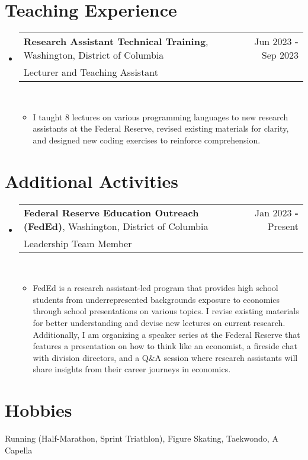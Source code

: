 \documentclass[letterpaper,11pt]{article}
\makeatletter
\newcommand{\Item}[1]{
  \item\small{
    {#1 \vspace{-2pt}}
  }
}
\newcommand{\Subheading}[4]{
  \vspace{-2pt}\item
    \begin{tabular*}{0.97\textwidth}[t]{l@{\extracolsep{\fill}}r}
      \textbf{#1}, #2 & #3 \\
      \small#4 \\
    \end{tabular*}\\
}
\newcommand{\SubHeadingListStart}{\begin{itemize}[leftmargin=0.15in, label={}]}
\newcommand{\SubHeadingListEnd}{\end{itemize}}
\newcommand{\ItemListStart}{\begin{itemize}}
\newcommand{\ItemListEnd}{\end{itemize}}
\makeatother
\begin{document}

\section{Teaching Experience}
  \SubHeadingListStart
    
    \Subheading
    {Research Assistant Technical Training}{Washington, District of Columbia}{Jun 2023 \textbf{-} Sep 2023}
    {Lecturer and Teaching Assistant}
      \vspace{-10pt}
      \ItemListStart
        \Item{I taught 8 lectures on various programming languages to 
        new research assistants at the Federal Reserve, revised existing 
        materials for clarity, and designed new coding exercises to reinforce 
        comprehension.}
      \ItemListEnd
  
  \SubHeadingListEnd




\section{Additional Activities}
  \SubHeadingListStart
    
    \Subheading
    {Federal Reserve Education Outreach (FedEd)}{Washington, District of 
    Columbia}{Jan 2023 \textbf{-} Present}
    {Leadership Team Member}
      \vspace{-10pt}
      \ItemListStart
        \Item{FedEd is a research assistant-led program that provides high 
          school students from underrepresented backgrounds exposure to 
          economics through school presentations on various topics. I revise 
          existing materials for better understanding and devise new lectures 
          on current research. Additionally, I am organizing a speaker series 
          at the Federal Reserve that features a presentation on how to think 
          like an economist, a fireside chat with division directors, and a 
          Q\&A session where research assistants will share insights from their 
          career journeys in economics.}
      \ItemListEnd

    \SubHeadingListEnd




\section{Hobbies}
  \SubHeadingListStart
    \small{\item{Running (Half-Marathon, Sprint Triathlon), Figure Skating, 
      Taekwondo, A Capella}}
  \SubHeadingListEnd
\end{document}
